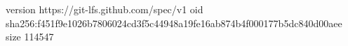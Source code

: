 version https://git-lfs.github.com/spec/v1
oid sha256:f451f9e1026b7806024cd3f5c44948a19fe16ab874b4f000177b5dc840d00aee
size 114547
